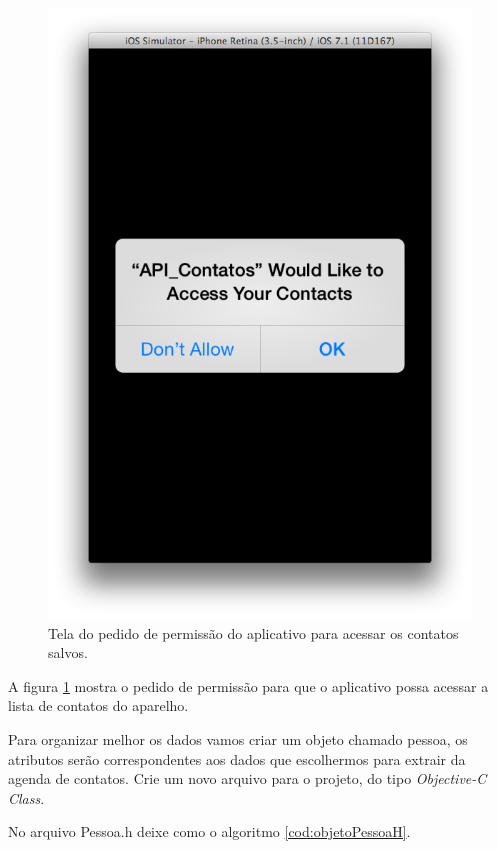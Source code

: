 \documentclass[a4paper,12pt,brazil,doubleside]{book}
\begin{document}
\begin{singlespace}
\begin{figure}[H]
  \centering
  \includegraphics[totalheight=0.55\textheight]{figuras/4/api_contatos2.png}
  \caption{Tela do pedido de permissão do aplicativo para acessar os contatos salvos.}
  \label{fig:permissaoApp2}
\end{figure}

A figura \ref{fig:permissaoApp2} mostra o pedido de permissão para que o aplicativo possa acessar a lista de contatos do aparelho.

Para organizar melhor os dados vamos criar um objeto chamado pessoa, os atributos serão correspondentes aos dados que escolhermos para extrair da agenda de contatos.
Crie um novo arquivo para o projeto, do tipo \emph{Objective-C Class}.

No arquivo Pessoa.h deixe como o algoritmo \ref{cod:objetoPessoaH}.


\end{singlespace}
\end{document}
